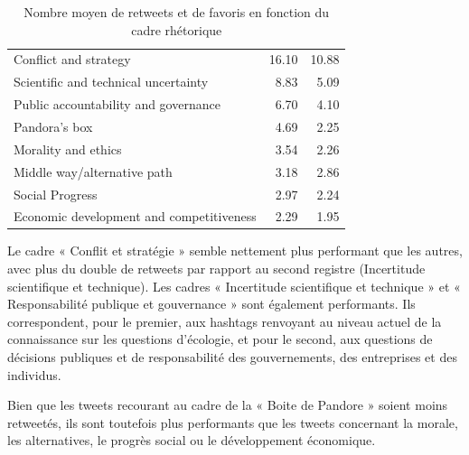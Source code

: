             \begin{table}
                \caption{Nombre moyen de retweets et de favoris en fonction du cadre rhétorique}
                \label{table:22rtmean}
                \centering
                \small
                \begin{tabularx}{\textwidth}{|X|R|R|}
                    \hline
                    &	&	 \\ \hline

                    Conflict and strategy&	16.10	&10.88 \\ \hline
                    Scientific and technical uncertainty&	8.83&	5.09\\ \hline
                    Public accountability and governance&	6.70&	4.10\\ \hline
                    Pandora’s box&	4.69&	2.25\\ \hline
                    Morality and ethics	&3.54&	2.26\\ \hline
                    Middle way/alternative path&	3.18&	2.86\\ \hline
                    Social Progress	&2.97&	2.24\\ \hline
                    Economic development and competitiveness&	2.29&	1.95\\ \hline

                \end{tabularx}
            \end{table}


            Le cadre « Conflit et stratégie » semble nettement plus performant que les autres, avec plus du double de retweets par rapport au second registre (Incertitude scientifique et technique). Les cadres « Incertitude scientifique et technique » et « Responsabilité publique et gouvernance » sont également performants. Ils correspondent, pour le premier, aux hashtags renvoyant au niveau actuel de la connaissance sur les questions d’écologie, et pour le second, aux questions de décisions publiques et de responsabilité des gouvernements, des entreprises et des individus.

            Bien que les tweets recourant au cadre de la « Boite de Pandore » soient moins retweetés, ils sont toutefois plus performants que les tweets concernant la morale, les alternatives, le progrès social ou le développement économique.  \\

